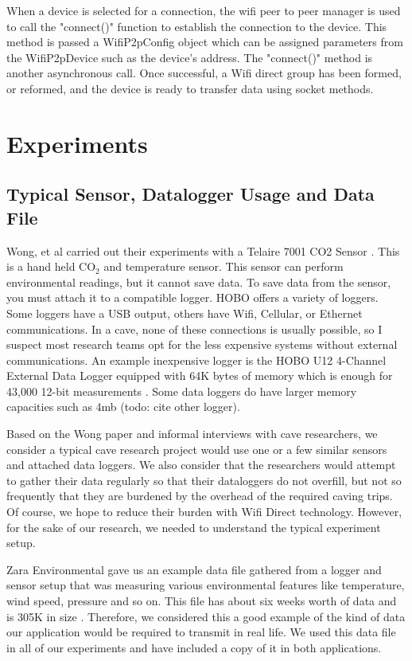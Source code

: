 \documentclass[10pt,twocolumn]{article}
\begin{document}
When a device is selected for a connection, the wifi peer to peer manager is used to call the "connect()" function to establish the connection to the device. 
This method is passed a WifiP2pConfig object which can be assigned parameters from the WifiP2pDevice such as the device's address.
The "connect()" method is another asynchronous call. 
Once successful, a Wifi direct group has been formed, or reformed, and the device is ready to transfer data using socket methods.

\section{Experiments}

\subsection{Typical Sensor, Datalogger Usage and Data File}
Wong, et al carried out their experiments with a Telaire 7001 CO2 Sensor \cite{telaire} \cite{wong2010}. 
This is a hand held CO$_2$ and temperature sensor.
This sensor can perform environmental readings, but it cannot save data.
To save data from the sensor, you must attach it to a compatible logger.
HOBO offers a variety of loggers.
Some loggers have a USB output, others have Wifi, Cellular, or Ethernet communications.
In a cave, none of these connections is usually possible, so I suspect most research teams opt for the less expensive systems without external communications.
An example inexpensive logger is the HOBO U12 4-Channel External Data Logger equipped with 64K bytes of memory which is enough for 43,000 12-bit measurements \cite{logger}. 
Some data loggers do have larger memory capacities such as 4mb (todo: cite other logger).

Based on the Wong paper and informal interviews with cave researchers, we consider a typical cave research project would use one or a few similar sensors and attached data loggers.
We also consider that the researchers would attempt to gather their data regularly so that their dataloggers do not overfill, but not so frequently that they are burdened by the overhead of the required caving trips.
Of course, we hope to reduce their burden with Wifi Direct technology.
However, for the sake of our research, we needed to understand the typical experiment setup.

Zara Environmental gave us an example data file gathered from a logger and sensor setup that was measuring various environmental features like temperature, wind speed, pressure and so on.
This file has about six weeks worth of data and is 305K in size \cite{datafile}.
Therefore, we considered this a good example of the kind of data our application would be required to transmit in real life.
We used this data file in all of our experiments and have included a copy of it in both applications.
\end{document}
